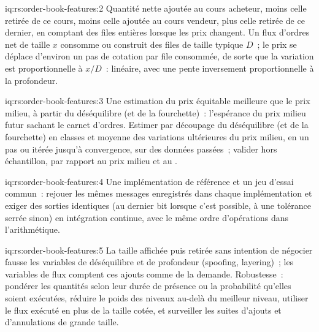 \begin{solution}{iq:rs:order-book-features:2}
Quantité nette ajoutée au cours acheteur, moins celle retirée de ce cours, moins celle ajoutée au cours vendeur, plus celle retirée de ce dernier, en comptant des files entières lorsque les prix changent.
Un flux d'ordres net de taille $x$ consomme ou construit des files de taille typique $D$~; le prix se déplace d'environ un pas de cotation par file consommée, de sorte que la
variation est proportionnelle à $x/D$~: linéaire, avec une pente inversement proportionnelle à la profondeur.
\end{solution}

\begin{solution}{iq:rs:order-book-features:3}
Une estimation du prix équitable meilleure que le prix milieu, à partir du déséquilibre (et de la fourchette)~: l'espérance du prix milieu futur sachant le carnet d'ordres. Estimer par
découpage du déséquilibre (et de la fourchette) en classes et moyenne des variations ultérieures du prix milieu, en un pas ou itérée jusqu'à convergence, sur des données passées~; valider hors
échantillon, par rapport au prix milieu et au .
\end{solution}

\begin{solution}{iq:rs:order-book-features:4}
Une implémentation de référence et un jeu d'essai commun~: rejouer les mêmes messages enregistrés dans chaque implémentation et exiger des
sorties identiques (au dernier bit lorsque c'est possible, à une tolérance serrée sinon) en intégration continue, avec le même ordre d'opérations dans
l'arithmétique.
\end{solution}

\begin{solution}{iq:rs:order-book-features:5}
La taille affichée puis retirée sans intention de négocier fausse les variables de déséquilibre et de profondeur (spoofing, layering)~; les variables de flux comptent ces ajouts
comme de la demande. Robustesse~: pondérer les quantités selon leur durée de présence ou la probabilité qu'elles soient exécutées, réduire le poids des niveaux au-delà du meilleur niveau, utiliser
le flux exécuté en plus de la taille cotée, et surveiller les suites d'ajouts et d'annulations de grande taille.
\end{solution}

